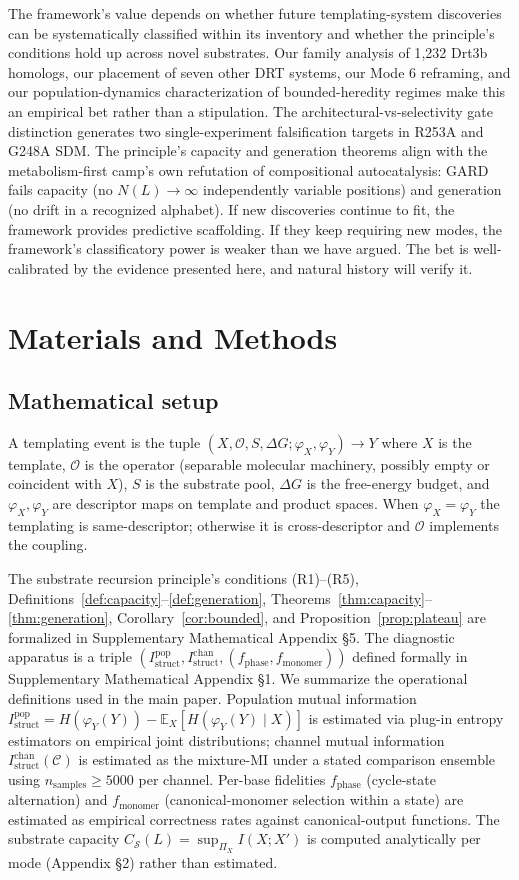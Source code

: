 \documentclass[aps,prx,reprint,amsmath,amssymb,floatfix,superscriptaddress,nofootinbib]{revtex4-2}
\theoremstyle{plain-thm}
\theoremstyle{definition-thm}
\newcommand{\Istructpop}{I_{\mathrm{struct}}^{\mathrm{pop}}}
\newcommand{\Istructchan}{I_{\mathrm{struct}}^{\mathrm{chan}}}
\newcommand{\fphase}{f_{\mathrm{phase}}}
\newcommand{\fmonomer}{f_{\mathrm{monomer}}}
\newcommand{\Csub}{C_{\mathcal{S}}}
\newcommand{\descX}{\varphi_X}
\newcommand{\descY}{\varphi_Y}
\newcommand{\Op}{\mathcal{O}}
\begin{document}
The framework's value depends on whether future templating-system discoveries can be systematically classified within its inventory and whether the principle's conditions hold up across novel substrates. Our family analysis of 1{,}232 Drt3b homologs, our placement of seven other DRT systems, our Mode 6 reframing, and our population-dynamics characterization of bounded-heredity regimes make this an empirical bet rather than a stipulation. The architectural-vs-selectivity gate distinction generates two single-experiment falsification targets in R253A and G248A SDM. The principle's capacity and generation theorems align with the metabolism-first camp's own refutation of compositional autocatalysis: GARD fails capacity (no $N(L) \to \infty$ independently variable positions) and generation (no drift in a recognized alphabet). If new discoveries continue to fit, the framework provides predictive scaffolding. If they keep requiring new modes, the framework's classificatory power is weaker than we have argued. The bet is well-calibrated by the evidence presented here, and natural history will verify it.


\section{Materials and Methods}

\subsection{Mathematical setup}

A templating event is the tuple $(X, \Op, S, \Delta G; \descX, \descY) \to Y$ where $X$ is the template, $\Op$ is the operator (separable molecular machinery, possibly empty or coincident with $X$), $S$ is the substrate pool, $\Delta G$ is the free-energy budget, and $\descX, \descY$ are descriptor maps on template and product spaces. When $\descX = \descY$ the templating is same-descriptor; otherwise it is cross-descriptor and $\Op$ implements the coupling.

The substrate recursion principle's conditions (R1)--(R5), Definitions~\ref{def:capacity}--\ref{def:generation}, Theorems~\ref{thm:capacity}--\ref{thm:generation}, Corollary~\ref{cor:bounded}, and Proposition~\ref{prop:plateau} are formalized in Supplementary Mathematical Appendix \S5. The diagnostic apparatus is a triple $(\Istructpop, \Istructchan, (\fphase, \fmonomer))$ defined formally in Supplementary Mathematical Appendix \S1. We summarize the operational definitions used in the main paper. Population mutual information $\Istructpop = H(\descY(Y)) - \mathbb{E}_X[H(\descY(Y) \mid X)]$ is estimated via plug-in entropy estimators on empirical joint distributions; channel mutual information $\Istructchan(\mathcal{C})$ is estimated as the mixture-MI under a stated comparison ensemble using $n_{\mathrm{samples}} \ge 5000$ per channel. Per-base fidelities $\fphase$ (cycle-state alternation) and $\fmonomer$ (canonical-monomer selection within a state) are estimated as empirical correctness rates against canonical-output functions. The substrate capacity $\Csub(L) = \sup_{\Pi_X} I(X; X')$ is computed analytically per mode (Appendix \S2) rather than estimated.
\end{document}
